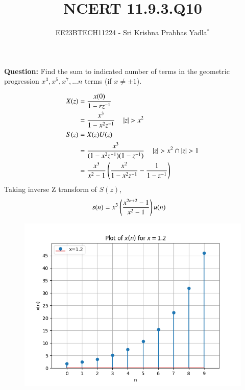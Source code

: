\documentclass[journal,12pt,twocolumn]{IEEEtran}
\theoremstyle{remark}
\begin{document}

\vspace{3cm}

\title{NCERT 11.9.3.Q10}
\author{EE23BTECH11224 - Sri Krishna Prabhas Yadla$^{*}$%
}
\maketitle
\newpage
\bigskip

\renewcommand{\thefigure}{\arabic{figure}}
\renewcommand{\thetable}{\arabic{table}}


\vspace{3cm}
\textbf{Question:} Find the sum to indicated number of terms in the geometric progression \(x^3,x^5,x^7,...n\) terms (if \(x\neq\pm1\)).
\\
\solution

\newline
\begin{align}
	X(z) &= \frac{x(0)}{1-rz^{-1}} \\
	&= \frac{x^3}{1-x^2z^{-1}} \quad \left\vert z\right\vert>x^2 \\
	S(z) &= X(z)U(z) \\
	&= \frac{x^3}{(1-x^2z^{-1})(1-z^{-1})} \quad  \left\vert z\right\vert > x^2 \cap \left\vert z\right\vert>1\\
	&= \frac{x^3}{x^2-1}\left(\frac{x^2}{1-x^2z^{-1}}-\frac{1}{1-z^{-1}}\right)
\end{align}
Taking inverse Z transform of $S(z)$,
\begin{align}
	s(n) &= x^3\left(\frac{x^{2n+2}-1}{x^2-1}\right)u(n)
\end{align}
\begin{figure}[ht!]
	\includegraphics[width=\columnwidth]{figs/plot_2.png}
	\caption{}
	\label{fig:1.2}
\end{figure}
\end{document}

